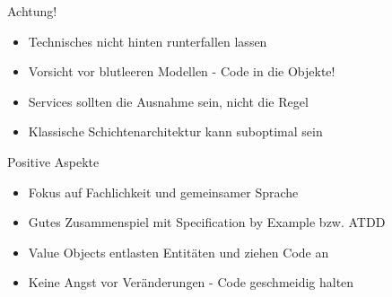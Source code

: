 
\begin{frame}{Achtung!}
\begin{itemize}
\item Technisches nicht hinten runterfallen lassen
\item Vorsicht vor blutleeren Modellen - Code in die Objekte!
\item Services sollten die Ausnahme sein, nicht die Regel
\item Klassische Schichtenarchitektur kann suboptimal sein
\end{itemize}
\end{frame}


\begin{frame}{Positive Aspekte}
\begin{itemize}
\item Fokus auf Fachlichkeit und gemeinsamer Sprache
\item Gutes Zusammenspiel mit Specification by Example bzw. ATDD
\item Value Objects entlasten Entitäten und ziehen Code an
\item Keine Angst vor Veränderungen - Code geschmeidig halten
\end{itemize}
\end{frame}



%


